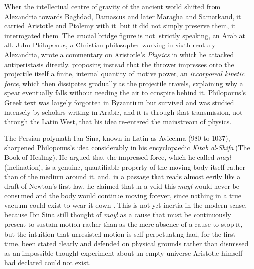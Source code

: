     When the intellectual centre of gravity of the ancient world shifted from Alexandria towards Baghdad, Damascus and later Maragha and Samarkand, it carried Aristotle and Ptolemy with it, but it did not simply preserve them, it interrogated them. The crucial bridge figure is not, strictly speaking, an Arab at all: John Philoponus, a Christian philosopher working in sixth century Alexandria, wrote a commentary on Aristotle's \textit{Physics} in which he attacked antiperistasis directly, proposing instead that the thrower impresses onto the projectile itself a finite, internal quantity of motive power, an \textit{incorporeal kinetic force}, which then dissipates gradually as the projectile travels, explaining why a spear eventually falls without needing the air to conspire behind it. Philoponus's Greek text was largely forgotten in Byzantium but survived and was studied intensely by scholars writing in Arabic, and it is through that transmission, not through the Latin West, that his idea re-entered the mainstream of physics.

    The Persian polymath Ibn Sina, known in Latin as Avicenna (980 to 1037), sharpened Philoponus's idea considerably in his encyclopaedic \textit{Kitab al-Shifa} (The Book of Healing). He argued that the impressed force, which he called \textit{mayl} (inclination), is a genuine, quantifiable property of the moving body itself rather than of the medium around it, and, in a passage that reads almost eerily like a draft of Newton's first law, he claimed that in a void this \textit{mayl} would never be consumed and the body would continue moving forever, since nothing in a true vacuum could exist to wear it down \citep{rashed1996}. This is not yet inertia in the modern sense, because Ibn Sina still thought of \textit{mayl} as a cause that must be continuously present to sustain motion rather than as the mere absence of a cause to stop it, but the intuition that unresisted motion is self-perpetuating had, for the first time, been stated clearly and defended on physical grounds rather than dismissed as an impossible thought experiment about an empty universe Aristotle himself had declared could not exist.

